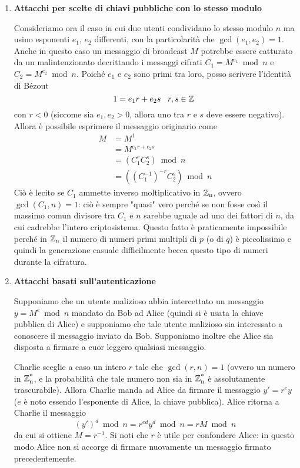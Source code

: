 \begin{enumerate}
\item \textbf{Attacchi per scelte di chiavi pubbliche con lo stesso modulo}

Consideriamo ora il caso in cui due utenti condividano lo stesso modulo $n$ ma usino esponenti $e_1$, $e_2$ differenti, con la particolarità che $\gcd(e_1,e_2)=1$. Anche in questo caso un messaggio di broadcast $M$ potrebbe essere catturato da un malintenzionato decrittando i messaggi cifrati $C_1=M^{e_1}\bmod n$ e $C_2=M^{e_2}\bmod n$. Poiché $e_1$ e $e_2$ sono primi tra loro, posso scrivere l'identità di Bézout
\[
1=e_1r + e_2s\,\,\,\,\, r,s\in\operatorname*{\mathbb{Z}}\
\]
con $r<0$ (siccome sia $e_1,e_2>0$, allora uno tra $r$ e $s$ deve essere negativo). Allora è possibile esprimere il messaggio originario come
\begin{align*}
M&=M^1 \\
&=M^{e_1r+e_2s} \\
&=(C_1^rC_2^s)\bmod n \\
&=((C_1^{-1})^{-r}C_2^s)\bmod n 
\end{align*}
Ciò è lecito se $C_1$ ammette inverso moltiplicativo in $\operatorname*{\mathbb{Z}_n}$, ovvero $\gcd(C_1,n)=1$: ciò è sempre "quasi" vero perché se non fosse così il massimo comun divisore tra $C_1$ e $n$ sarebbe uguale ad uno dei fattori di $n$, da cui cadrebbe l'intero criptosistema. Questo fatto è praticamente impossibile perché in $\operatorname*{\mathbb{Z}_n}$ il numero di numeri primi multipli di $p$ (o di $q$) è piccolissimo e quindi la generazione casuale difficilmente becca questo tipo di numeri durante la cifratura.

\item \textbf{Attacchi basati sull'autenticazione}

Supponiamo che un utente malizioso abbia intercettato un messaggio $y=M^e\bmod n$ mandato da Bob ad Alice (quindi si è usata la chiave pubblica di Alice) e supponiamo che tale utente malizioso sia interessato a conoscere il messaggio inviato da Bob. Supponiamo inoltre che Alice sia disposta a firmare a cuor leggero qualsiasi messaggio. 

Charlie sceglie a caso un intero $r$ tale che $\gcd(r,n)=1$ (ovvero un numero in $\operatorname*{\mathbb{Z}_n^*}$, e la probabilità che tale numero non sia in $\operatorname*{\mathbb{Z}_n^*}$ è assolutamente trascurabile). Allora Charlie manda ad Alice da firmare il messaggio $y'=r^ey$ ($e$ è noto essendo l'esponente di Alice, la chiave pubblica). Alice ritorna a Charlie il messaggio 
\[
(y')^d\bmod n = r^{ed}y^d\bmod n = rM\bmod n
\]
da cui si ottiene $M=r^{-1}$. Si noti che $r$ è utile per confondere Alice: in questo modo Alice non si accorge di firmare nuovamente un messaggio firmato precedentemente.
\end{enumerate}

